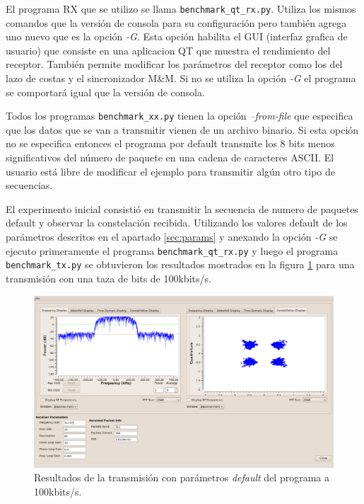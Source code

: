 El programa RX que se utilizo se llama \verb|benchmark_qt_rx.py|. Utiliza los mismos comandos que la
versi\'on de consola para su configuraci\'on pero tambi\'en agrega uno nuevo que es la opci\'on
\emph{-G}. Esta opci\'on habilita el GUI (interfaz grafica de usuario) que consiste en una
aplicacion QT que muestra el rendimiento del receptor. Tambi\'en permite modificar los par\'ametros
del receptor como los del lazo de costas y el sincronizador M\&M. Si no se utiliza la opci\'on
\emph{-G} el programa se comportar\'a igual que la versi\'on de consola.

Todos los programas \verb|benchmark_xx.py| tienen la opci\'on \emph{--from-file} que especifica que
los datos que se van a transmitir vienen de un archivo binario. Si esta opci\'on no se especifica
entonces el programa por default transmite los 8 bits menos significativos del n\'umero de paquete
en una cadena de caracteres ASCII. El usuario est\'a libre de modificar el ejemplo para transmitir
alg\'un otro tipo de secuencias.

El experimento inicial consisti\'o en transmitir la secuencia de numero de paquetes default y
observar la constelaci\'on recibida. Utilizando los valores default de los par\'ametros descritos en
el apartado \ref{sec:params} y anexando la opci\'on \emph{-G} se ejecuto primeramente el programa
\verb|benchmark_qt_rx.py| y luego el programa \verb|benchmark_tx.py| se obtuvieron los resultados
mostrados en la figura \ref{fig:dqpsktrans} para una transmisi\'on con una taza de bits de
100kbits/s.

\begin{figure}[htp]
  \centering
  \includegraphics[width=5.9in]{figs/dqpsktrans}
  \vspace{0.3in}
  \caption{Resultados de la transmisi\'on con par\'ametros \emph{default} del programa a 100kbits/s.}
  \label{fig:dqpsktrans}
\end{figure}

